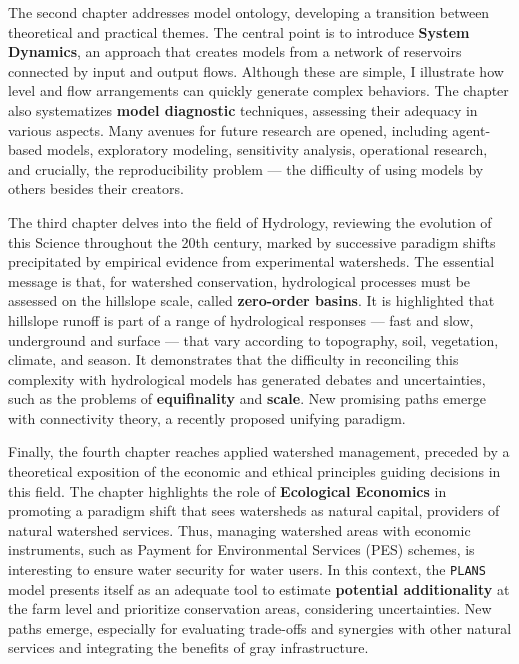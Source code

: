 \documentclass[./main_en.tex]{subfiles}
\begin{document}
\par The second chapter addresses model ontology, developing a transition between theoretical and practical themes. The central point is to introduce \textbf{System Dynamics}, an approach that creates models from a network of reservoirs connected by input and output flows. Although these  are simple, I illustrate how level and flow arrangements can quickly generate complex behaviors. The chapter also systematizes \textbf{model diagnostic} techniques, assessing their adequacy in various aspects. Many avenues for future research are opened, including agent-based models, exploratory modeling, sensitivity analysis, operational research, and crucially, the reproducibility problem — the difficulty of using models by others besides their creators.

\par The third chapter delves into the field of Hydrology, reviewing the evolution of this Science throughout the 20th century, marked by successive paradigm shifts precipitated by empirical evidence from experimental watersheds. The essential message is that, for watershed conservation, hydrological processes must be assessed on the hillslope scale, called \textbf{zero-order basins}. It is highlighted that hillslope runoff is part of a range of hydrological responses — fast and slow, underground and surface — that vary according to topography, soil, vegetation, climate, and season. It demonstrates that the difficulty in reconciling this complexity with hydrological models has generated debates and uncertainties, such as the problems of \textbf{equifinality} and \textbf{scale}. New promising paths emerge with connectivity theory, a recently proposed unifying paradigm.

\par Finally, the fourth chapter reaches applied watershed management, preceded by a theoretical exposition of the economic and ethical principles guiding decisions in this field. The chapter highlights the role of \textbf{Ecological Economics} in promoting a paradigm shift that sees watersheds as natural capital, providers of natural watershed services. Thus, managing watershed areas with economic instruments, such as Payment for Environmental Services (PES) schemes, is interesting to ensure water security for water users. In this context, the \texttt{PLANS} model presents itself as an adequate tool to estimate \textbf{potential additionality} at the farm level and prioritize conservation areas, considering uncertainties. New paths emerge, especially for evaluating trade-offs and synergies with other natural services and integrating the benefits of gray infrastructure.
\end{document}
